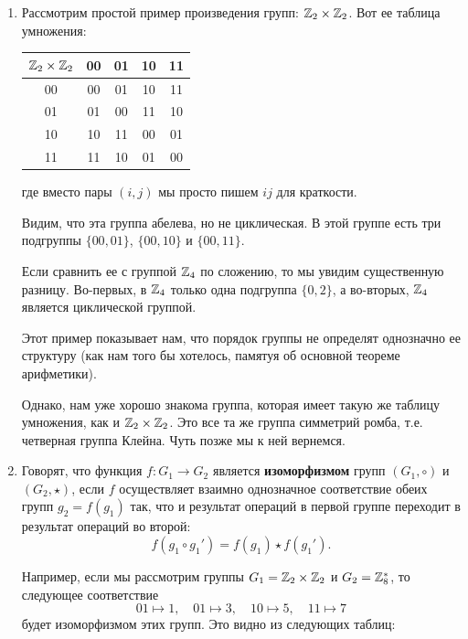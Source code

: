 \begin{enumerate}
\item Рассмотрим простой пример произведения групп: $\mathbb Z_2\times\mathbb Z_2$. Вот ее таблица умножения:

\begin{center}
\begin{tabular}{c|cccc}
$\mathbb Z_2\times\mathbb Z_2$ & 00 & 01 & 10 & 11\\  \hline
00 & 00 & 01 & 10 & 11 \\
01 & 01 & 00 & 11 & 10 \\
10 & 10 & 11 & 00 & 01 \\
11 & 11 & 10 & 01 & 00
\end{tabular}
\end{center}
где вместо пары $(i,j)$ мы просто пишем $ij$ для краткости.

Видим, что эта группа абелева, но не циклическая. В этой группе есть три подгруппы $\{00,01\}$, $\{00,10\}$ и $\{00,11\}$.

Если сравнить ее с группой $\mathbb Z_4$ по сложению, то мы увидим существенную разницу. Во-первых, в $\mathbb Z_4$ только одна подгруппа $\{0,2\}$, а во-вторых, $\mathbb Z_4$ является циклической группой.

Этот пример показывает нам, что порядок группы не определят однозначно ее структуру (как нам того бы хотелось, памятуя об основной теореме арифметики).

Однако, нам уже хорошо знакома группа, которая имеет такую же таблицу умножения, как и $\mathbb Z_2\times\mathbb Z_2$. Это все та же группа симметрий ромба, т.е. четверная группа Клейна. Чуть позже мы к ней вернемся.

\item Говорят, что функция $f:G_1\to G_2$ является \textbf{изоморфизмом} групп $(G_1,\circ)$ и $(G_2,\star)$, если $f$ осуществляет взаимно однозначное соответствие обеих групп $g_2=f(g_1)$ так, что и результат операций в первой группе переходит в результат операций во второй:
$$
f(g_1\circ g_1') = f(g_1)\star f(g_1').
$$

Например, если мы рассмотрим группы $G_1=\mathbb Z_2\times\mathbb Z_2$ и $G_2=\mathbb Z_8^*$, то следующее соответствие
$$
01\mapsto 1,\quad 01\mapsto 3,\quad 10\mapsto 5, \quad 11\mapsto 7
$$
будет изоморфизмом этих групп. Это видно из следующих таблиц:


\end{enumerate}
